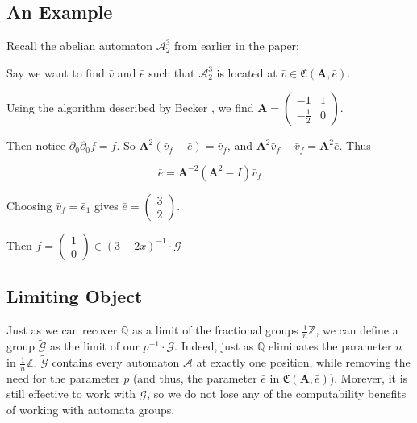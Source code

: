\documentclass[final]{ws-ijac}
\newcommand{\A}{\mathcal{A}}
\newcommand{\G}{\mathcal{G}}
\newcommand{\C}{\mathfrak{C}(\Am,\e)}
\newcommand{\Z}{\mathbb{Z}}
\newcommand{\Q}{\mathbb{Q}}
\newcommand{\2}{\textbf{2}}
\newcommand{\Am}{\textbf{A}}
\newcommand{\del}{\partial}
\newcommand{\vv}{\bar{v}}
\newcommand{\e}{\bar{e}}
\begin{document}
\subsection{An Example}
Recall the abelian automaton $\A^3_2$ from earlier in the paper:

\begin{center}
\end{center}

Say we want to find $\vv$ and $\e$ such that $\A^3_2$ is located at 
$\vv \in \C$.

Using the algorithm described by Becker \cite{Becker18:thesis}, we find
$\Am = \begin{pmatrix} -1 & 1 \\ -\frac{1}{2} & 0 \end{pmatrix}$.

Then notice $\del_0 \del_0 f = f$.
So $\Am^2 (\vv_f - \e) = \vv_f$, and
$\Am^2 \vv_f - \vv_f = \Am^2 \e$. Thus

\[ \e = \Am^{-2} (\Am^2 - I) \vv_f \]

Choosing $\vv_f = \e_1$ gives $\e = \begin{pmatrix} 3 \\ 2 \end{pmatrix}$.

Then $f = \begin{pmatrix} 1 \\ 0 \end{pmatrix} \in (3+2x)^{-1} \cdot \G$

\subsection{Limiting Object}
Just as we can recover $\Q$ as a limit of the fractional groups 
$\frac{1}{n} \Z$, we can define a group $\widetilde{\G}$ as the limit of
our $p^{-1} \cdot \G$. Indeed, just as
$\Q$ eliminates the parameter $n$ in $\frac{1}{n} \Z$, $\widetilde{\G}$ 
contains every automaton $\A$ at exactly one position, while removing the need
for the parameter $p$ (and thus, the parameter $\e$ in $\C$). Morever, it is
still effective to work with $\widetilde{\G}$, so we do not lose any of the
computability benefits of working with automata groups.
\end{document}
